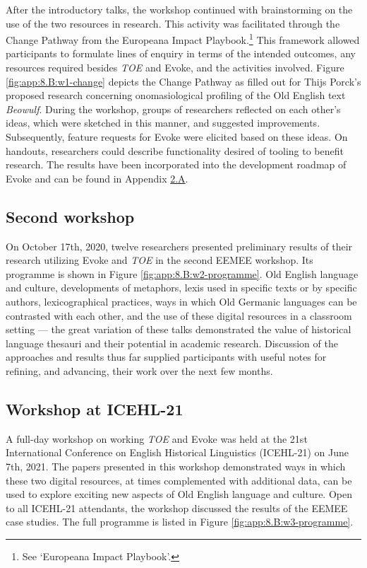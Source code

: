 After the introductory talks, the workshop continued with brainstorming on the use of the two resources in research. 
This activity was facilitated through the Change Pathway from the Europeana Impact Playbook.\footnote{See `Europeana Impact Playbook'.} This framework allowed participants to formulate lines of enquiry in terms of the intended outcomes, any resources required besides \textit{TOE} and Evoke, and the activities involved. 
Figure \ref{fig:app:8.B:w1-change} depicts the Change Pathway as filled out for Thijs Porck's proposed research concerning onomasiological profiling of the Old English text \textit{Beowulf}. During the workshop, groups of researchers reflected on each other's ideas, which were sketched in this manner, and suggested improvements. %
Subsequently, feature requests for Evoke were elicited based on these ideas. On handouts, researchers could describe functionality desired of tooling to benefit research. The results have been incorporated into the development roadmap of Evoke and can be found in Appendix \hyperref[Appendix2.A]{2.A}.

\subsection{Second workshop}

On October 17th, 2020, twelve researchers presented preliminary results of their research utilizing Evoke and \textit{TOE} in the second EEMEE workshop. Its programme is shown in Figure \ref{fig:app:8.B:w2-programme}. Old English language and culture, developments of metaphors, lexis used in specific texts or by specific authors, lexicographical practices, ways in which Old Germanic languages can be contrasted with each other, and the use of these digital resources in a classroom setting --- the great variation of these talks demonstrated the value of historical language thesauri and their potential in academic research. Discussion of the approaches and results thus far supplied participants with useful notes for refining, and advancing, their work over the next few months.

\subsection{Workshop at ICEHL-21}

A full-day workshop on working \textit{TOE} and Evoke was held at the 21st International Conference on English Historical Linguistics (ICEHL-21) on June 7th, 2021. The papers presented in this workshop demonstrated ways in which these two digital resources, at times complemented with additional data, can be used to explore exciting new aspects of Old English language and culture. Open to all ICEHL-21 attendants, the workshop discussed the results of the EEMEE case studies. The full programme is listed in Figure \ref{fig:app:8.B:w3-programme}. 

